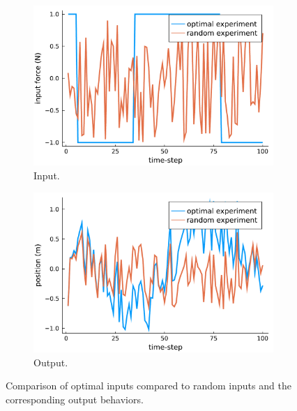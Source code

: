 \begin{figure}[H]
	\begin{subfigure}[b]{0.45\textwidth}
		\includegraphics[width=1.0\textwidth]{figure/paper 3/optimal input}
		\caption{Input.}
		\label{figInput}
	\end{subfigure}
	\begin{subfigure}[b]{0.45\textwidth}
		\centering
		\includegraphics[width=1.0\textwidth]{figure/paper 3/optimal measurement}
		\caption{Output.}
		\label{figOutput}
	\end{subfigure}
	\caption{Comparison of optimal inputs compared to random inputs and the corresponding output behaviors.} 
\end{figure}
